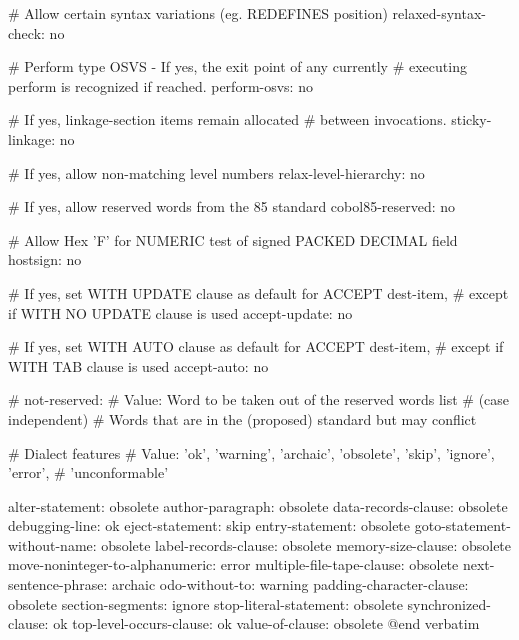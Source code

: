 # Allow certain syntax variations (eg. REDEFINES position)
relaxed-syntax-check:		no

# Perform type OSVS - If yes, the exit point of any currently
# executing perform is recognized if reached.
perform-osvs:			no

# If yes, linkage-section items remain allocated
# between invocations.
sticky-linkage:			no

# If yes, allow non-matching level numbers
relax-level-hierarchy:		no

# If yes, allow reserved words from the 85 standard
cobol85-reserved:		no

# Allow Hex 'F' for NUMERIC test of signed PACKED DECIMAL field
hostsign:			no

# If yes, set WITH UPDATE clause as default for ACCEPT dest-item,
# except if WITH NO UPDATE clause is used
accept-update:		no

# If yes, set WITH AUTO clause as default for ACCEPT dest-item,
# except if WITH TAB clause is used
accept-auto:		no

# not-reserved:
# Value: Word to be taken out of the reserved words list
# (case independent)
# Words that are in the (proposed) standard but may conflict

# Dialect features
# Value: 'ok', 'warning', 'archaic', 'obsolete', 'skip', 'ignore', 'error',
#        'unconformable'

alter-statement:			obsolete
author-paragraph:			obsolete
data-records-clause:			obsolete
debugging-line:				ok
eject-statement:			skip
entry-statement:			obsolete
goto-statement-without-name:		obsolete
label-records-clause:			obsolete
memory-size-clause:			obsolete
move-noninteger-to-alphanumeric:	error
multiple-file-tape-clause:		obsolete
next-sentence-phrase:			archaic
odo-without-to:				warning
padding-character-clause:		obsolete
section-segments:			ignore
stop-literal-statement:			obsolete
synchronized-clause:			ok
top-level-occurs-clause:		ok
value-of-clause:			obsolete
@end verbatim

